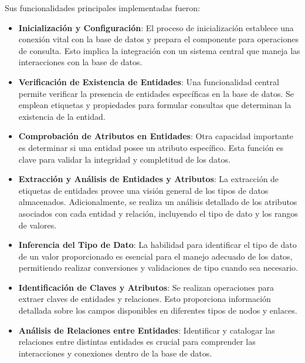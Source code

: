 Sus funcionalidades principales implementadas fueron:

\begin{itemize}
\item \textbf{Inicialización y Configuración}: El proceso de inicialización establece una conexión vital con la base de datos y prepara el componente para operaciones de consulta. Esto implica la integración con un sistema central que maneja las interacciones con la base de datos.

\item \textbf{Verificación de Existencia de Entidades}: Una funcionalidad central permite verificar la presencia de entidades específicas en la base de datos. Se emplean etiquetas y propiedades para formular consultas que determinan la existencia de la entidad.

\item \textbf{Comprobación de Atributos en Entidades}: Otra capacidad importante es determinar si una entidad posee un atributo específico. Esta función es clave para validar la integridad y completitud de los datos.

\item \textbf{Extracción y Análisis de Entidades y Atributos}: La extracción de etiquetas de entidades provee una visión general de los tipos de datos almacenados. Adicionalmente, se realiza un análisis detallado de los atributos asociados con cada entidad y relación, incluyendo el tipo de dato y los rangos de valores.

\item \textbf{Inferencia del Tipo de Dato}: La habilidad para identificar el tipo de dato de un valor proporcionado es esencial para el manejo adecuado de los datos, permitiendo realizar conversiones y validaciones de tipo cuando sea necesario.

\item \textbf{Identificación de Claves y Atributos}: Se realizan operaciones para extraer claves de entidades y relaciones. Esto proporciona información detallada sobre los campos disponibles en diferentes tipos de nodos y enlaces.

\item \textbf{Análisis de Relaciones entre Entidades}: Identificar y catalogar las relaciones entre distintas entidades es crucial para comprender las interacciones y conexiones dentro de la base de datos.
\end{itemize}

